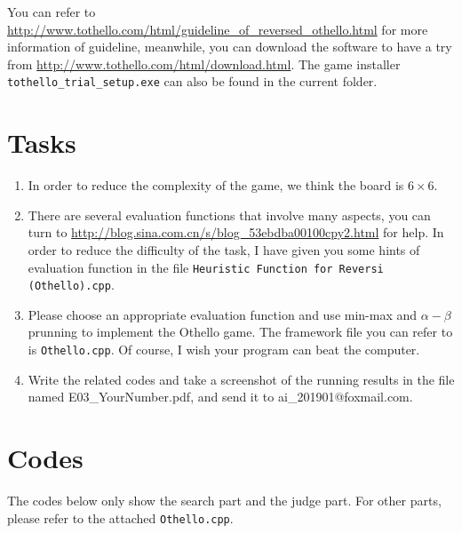 ﻿\documentclass[a4paper, 11pt]{article}
\begin{document}
You can refer to \url{http://www.tothello.com/html/guideline_of_reversed_othello.html} for more information of guideline, meanwhile, you can download the software to have a try from \url{http://www.tothello.com/html/download.html}. The game installer \texttt{tothello\_trial\_setup.exe} can also be found in the current folder.


\section{Tasks}
\begin{enumerate}

\item In order to reduce the complexity of the game, we think the board is $6\times 6$.

\item There are several evaluation functions that involve many aspects, you can turn to \url{http://blog.sina.com.cn/s/blog_53ebdba00100cpy2.html} for help. In order to reduce the difficulty of the task, I have given you some hints of evaluation function in the file \texttt{Heuristic Function for Reversi (Othello).cpp}.

\item Please choose an appropriate evaluation function and use min-max and $\alpha-\beta$ prunning to implement the Othello game. The framework file you can refer to is \texttt{Othello.cpp}. Of course, I wish your program can beat the computer.

\item Write the related codes and take a screenshot of the running results in the file named \textsf{E03\_YourNumber.pdf}, and send it to \textsf{ai\_201901@foxmail.com}.
\end{enumerate}


\section{Codes}
The codes below only show the search part and the judge part.
For other parts, please refer to the attached \verb'Othello.cpp'.
\end{document}
